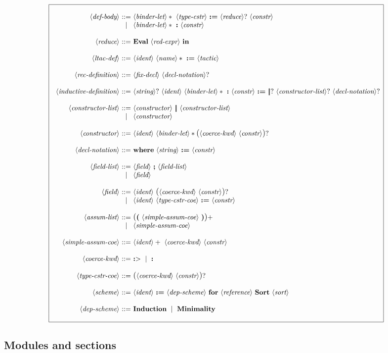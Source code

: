 \documentclass{article}
\makeatletter
\def\bfbar{\ensuremath{|\hskip -0.22em{}|\hskip -0.24em{}|}}
\def\TERMbar{\bfbar}
\def\GR#1{\text{\large(}#1\text{\large)}}
\def\NT#1{\langle\textit{#1}\rangle}
\def\TERM#1{{\bf\textrm{\bf #1}}}
\def\KWD#1{\TERM{#1}}
\def\STAR#1{#1*}
\def\PLUS#1{#1+}
\def\OPT#1{#1?}
\def\OPTGR#1{\GR{#1}?}
\newenvironment{cadre}
        {\begin{array}{|c|}\hline\\}
        {\\\\\hline\end{array}}
\newenvironment{rulebox}
        {$$\begin{cadre}\begin{array}{r@{~}c@{~}l@{}l@{}r}}
        {\end{array}\end{cadre}$$}
\def\DEFNT#1{\NT{#1} & ::= &}
\def\SEPDEF{\\\\}
\def\nlsep{\\&|&}
\newenvironment{rules}
        {\begin{center}\begin{rulebox}}
        {\end{rulebox}\end{center}}
\makeatother
\begin{document}
\begin{rules}
\DEFNT{def-body}
       \STAR{\NT{binder-let}}~\NT{type-cstr}~\KWD{:=}
       ~\OPT{\NT{reduce}}~\NT{constr}
\nlsep \STAR{\NT{binder-let}}~\KWD{:}~\NT{constr}
\SEPDEF
\DEFNT{reduce}
       \TERM{Eval}~\NT{red-expr}~\KWD{in}
\SEPDEF
\DEFNT{ltac-def}
       \NT{ident}~\STAR{\NT{name}}~\KWD{:=}~\NT{tactic}
\SEPDEF
\DEFNT{rec-definition}
       \NT{fix-decl}~\OPT{\NT{decl-notation}}
\SEPDEF
\DEFNT{inductive-definition}
       \OPT{\NT{string}}~\NT{ident}~\STAR{\NT{binder-let}}~\KWD{:}
       ~\NT{constr}~\KWD{:=}
       ~\OPT{\TERMbar}~\OPT{\NT{constructor-list}}
       ~\OPT{\NT{decl-notation}}
\SEPDEF
\DEFNT{constructor-list}
       \NT{constructor}~\TERMbar~\NT{constructor-list}
\nlsep \NT{constructor}
\SEPDEF
\DEFNT{constructor}
       \NT{ident}~\STAR{\NT{binder-let}}\OPTGR{\NT{coerce-kwd}~\NT{constr}}
\SEPDEF
\DEFNT{decl-notation}
       \TERM{where}~\NT{string}~\TERM{:=}~\NT{constr}
\SEPDEF
\DEFNT{field-list}
       \NT{field}~\KWD{;}~\NT{field-list}
\nlsep \NT{field}
\SEPDEF
\DEFNT{field}
       \NT{ident}~\OPTGR{\NT{coerce-kwd}~\NT{constr}}
\nlsep \NT{ident}~\NT{type-cstr-coe}~\KWD{:=}~\NT{constr}
\SEPDEF
\DEFNT{assum-list}
       \PLUS{\GR{\KWD{(}~\NT{simple-assum-coe}~\KWD{)}}}
\nlsep \NT{simple-assum-coe}
\SEPDEF
\DEFNT{simple-assum-coe}
       \PLUS{\NT{ident}}~\NT{coerce-kwd}~\NT{constr}
\SEPDEF
\DEFNT{coerce-kwd} \TERM{:$>$} ~\mid~ \KWD{:}
\SEPDEF
\DEFNT{type-cstr-coe} \OPTGR{\NT{coerce-kwd}~\NT{constr}}
\SEPDEF
\DEFNT{scheme}
       \NT{ident}~\KWD{:=}~\NT{dep-scheme}~\KWD{for}~\NT{reference}
       ~\TERM{Sort}~\NT{sort}
\SEPDEF
\DEFNT{dep-scheme}
       \TERM{Induction}~\mid~\TERM{Minimality}
\end{rules}

\subsection{Modules and sections}
\end{document}
